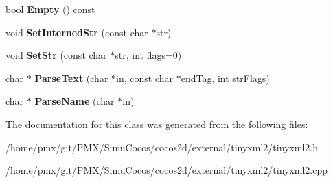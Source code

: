 \begin{DoxyCompactItemize}
bool {\bfseries Empty} () const
\item 
\mbox{\label{classtinyxml2_1_1StrPair_a2baf6230e18333e02ab65d0897ee3941}} 
void {\bfseries Set\+Interned\+Str} (const char $\ast$str)
\item 
\mbox{\label{classtinyxml2_1_1StrPair_a1f82ec6b5bee35ee7466d8565e43b1de}} 
void {\bfseries Set\+Str} (const char $\ast$str, int flags=0)
\item 
\mbox{\label{classtinyxml2_1_1StrPair_a7ff60a4aaea3ad696e940ecd31806a29}} 
char $\ast$ {\bfseries Parse\+Text} (char $\ast$in, const char $\ast$end\+Tag, int str\+Flags)
\item 
\mbox{\label{classtinyxml2_1_1StrPair_a8452c0c7f140d4d613134e952ce54f14}} 
char $\ast$ {\bfseries Parse\+Name} (char $\ast$in)
\end{DoxyCompactItemize}


The documentation for this class was generated from the following files\+:\begin{DoxyCompactItemize}
\item 
/home/pmx/git/\+P\+M\+X/\+Simu\+Cocos/cocos2d/external/tinyxml2/tinyxml2.\+h\item 
/home/pmx/git/\+P\+M\+X/\+Simu\+Cocos/cocos2d/external/tinyxml2/tinyxml2.\+cpp\end{DoxyCompactItemize}
